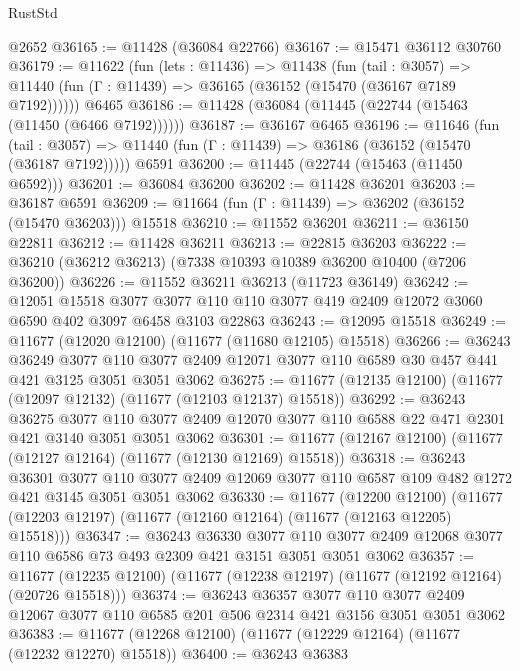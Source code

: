 \begin{lexlean}{RustStd}
\begin{coremodule}
    @2652
@36165 := @11428 (@36084 @22766)
@36167 := @15471 @36112 @30760
@36179 := @11622
    (fun (lets : @11436) =>
    @11438
      (fun (tail : @3057) =>
      @11440 (fun (Γ : @11439) => @36165 (@36152 (@15470 (@36167 @7189 @7192))))))
    @6465
@36186 := @11428 (@36084 (@11445 (@22744 (@15463 (@11450 (@6466 @7192))))))
@36187 := @36167 @6465
@36196 := @11646
    (fun (tail : @3057) => @11440 (fun (Γ : @11439) => @36186 (@36152 (@15470 (@36187 @7192)))))
    @6591
@36200 := @11445 (@22744 (@15463 (@11450 @6592)))
@36201 := @36084 @36200
@36202 := @11428 @36201
@36203 := @36187 @6591
@36209 := @11664 (fun (Γ : @11439) => @36202 (@36152 (@15470 @36203))) @15518
@36210 := @11552 @36201
@36211 := @36150 @22811
@36212 := @11428 @36211
@36213 := @22815 @36203
@36222 := @36210 (@36212 @36213) (@7338 @10393 @10389 @36200 @10400 (@7206 @36200))
@36226 := @11552 @36211 @36213 (@11723 @36149)
@36242 := @12051
    @15518
    @3077
    @3077
    @110
    @110
    @3077
    @419
    @2409
    @12072
    @3060
    @6590
    @402
    @3097
    @6458
    @3103
    @22863
@36243 := @12095 @15518
@36249 := @11677 (@12020 @12100) (@11677 (@11680 @12105) @15518)
@36266 := @36243
    @36249
    @3077
    @110
    @3077
    @2409
    @12071
    @3077
    @110
    @6589
    @30
    @457
    @441
    @421
    @3125
    @3051
    @3051
    @3062
@36275 := @11677 (@12135 @12100) (@11677 (@12097 @12132) (@11677 (@12103 @12137) @15518))
@36292 := @36243
    @36275
    @3077
    @110
    @3077
    @2409
    @12070
    @3077
    @110
    @6588
    @22
    @471
    @2301
    @421
    @3140
    @3051
    @3051
    @3062
@36301 := @11677 (@12167 @12100) (@11677 (@12127 @12164) (@11677 (@12130 @12169) @15518))
@36318 := @36243
    @36301
    @3077
    @110
    @3077
    @2409
    @12069
    @3077
    @110
    @6587
    @109
    @482
    @1272
    @421
    @3145
    @3051
    @3051
    @3062
@36330 := @11677
    (@12200 @12100)
    (@11677 (@12203 @12197) (@11677 (@12160 @12164) (@11677 (@12163 @12205) @15518)))
@36347 := @36243
    @36330
    @3077
    @110
    @3077
    @2409
    @12068
    @3077
    @110
    @6586
    @73
    @493
    @2309
    @421
    @3151
    @3051
    @3051
    @3062
@36357 := @11677 (@12235 @12100) (@11677 (@12238 @12197) (@11677 (@12192 @12164) (@20726 @15518)))
@36374 := @36243
    @36357
    @3077
    @110
    @3077
    @2409
    @12067
    @3077
    @110
    @6585
    @201
    @506
    @2314
    @421
    @3156
    @3051
    @3051
    @3062
@36383 := @11677 (@12268 @12100) (@11677 (@12229 @12164) (@11677 (@12232 @12270) @15518))
@36400 := @36243
    @36383

\end{coremodule}
\end{lexlean}
